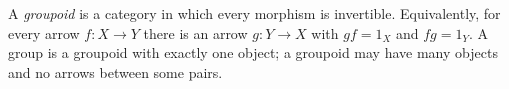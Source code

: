 
A \emph{groupoid} is a category in which every morphism is invertible. Equivalently, for every arrow $f:X\to Y$ there is an arrow $g:Y\to X$ with $g f=1_X$ and $f g=1_Y$. A group is a groupoid with exactly one object; a groupoid may have many objects and no arrows between some pairs.
